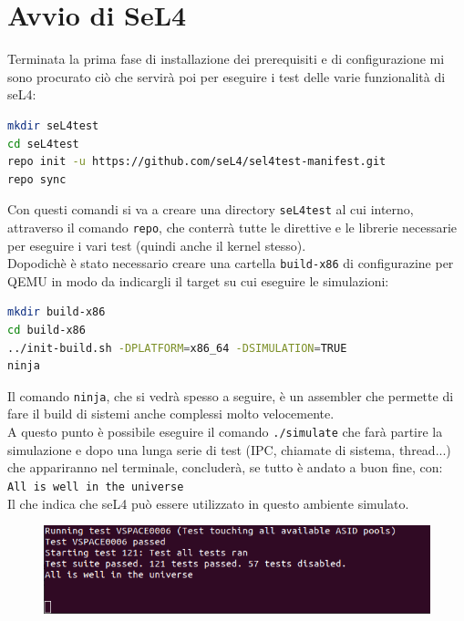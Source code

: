 \section{Avvio di SeL4}
Terminata la prima fase di installazione dei prerequisiti e di configurazione mi sono procurato ciò che servirà poi per eseguire i test delle varie funzionalità di seL4:
\begin{lstlisting}[language=bash]
mkdir seL4test
cd seL4test
repo init -u https://github.com/seL4/sel4test-manifest.git
repo sync
\end{lstlisting}
Con questi comandi si va a creare una directory \texttt{seL4test} al cui interno, attraverso il comando \texttt{repo}, che conterrà tutte le direttive e le librerie necessarie per eseguire i vari test (quindi anche il kernel stesso).\\
Dopodichè è stato necessario creare una cartella \texttt{build-x86} di configurazine per QEMU in modo da indicargli il target su cui eseguire le simulazioni:
\begin{lstlisting}[language=bash]
mkdir build-x86
cd build-x86
../init-build.sh -DPLATFORM=x86_64 -DSIMULATION=TRUE
ninja
\end{lstlisting}
Il comando \texttt{ninja}, che si vedrà spesso a seguire, è un assembler che permette di fare il build di sistemi anche complessi molto velocemente.\\
A questo punto è possibile eseguire il comando \texttt{./simulate} che farà partire la simulazione e dopo una lunga serie di test (IPC, chiamate di sistema, thread...) che appariranno nel terminale, concluderà, se tutto è andato a buon fine, con:\\
\texttt{All is well in the universe}\\
Il che indica che seL4 può essere utilizzato in questo ambiente simulato.
\begin{figure}[h!]
  \includegraphics[width=\linewidth]{img/PrimaSimulazione.png}
  \label{fig:Prima simulazione}
\end{figure}

